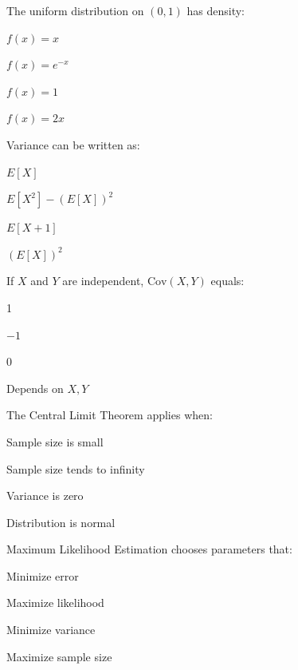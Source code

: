 \documentclass{CWNUExam}
\begin{document}
\begin{question}
The uniform distribution on $(0,1)$ has density:
\paren
\begin{choices}
\item $f(x)=x$
\item $f(x)=e^{-x}$
\item $f(x)=1$
\item $f(x)=2x$
\end{choices}
\end{question}

\begin{question}
Variance can be written as:
\paren
\begin{choices}
\item $E[X]$
\item $E[X^2]-(E[X])^2$
\item $E[X+1]$
\item $(E[X])^2$
\end{choices}
\end{question}

\begin{question}
If $X$ and $Y$ are independent, $\mathrm{Cov}(X,Y)$ equals:
\paren
\begin{choices}
\item 1
\item $-1$
\item 0
\item Depends on $X,Y$
\end{choices}
\end{question}

\begin{question}
The Central Limit Theorem applies when:
\paren
\begin{choices}
\item Sample size is small
\item Sample size tends to infinity
\item Variance is zero
\item Distribution is normal
\end{choices}
\end{question}

\begin{question}
Maximum Likelihood Estimation chooses parameters that:
\paren
\begin{choices}
\item Minimize error
\item Maximize likelihood
\item Minimize variance
\item Maximize sample size
\end{choices}
\end{question}
\end{document}
